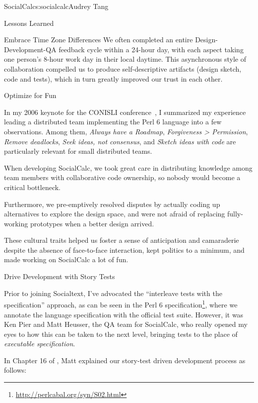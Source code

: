 \begin{aosachapter}{SocialCalc}{s:socialcalc}{Audrey Tang}
\begin{aosasect1}{Lessons Learned}
\begin{aosasect2}{Embrace Time Zone Differences}
We often completed an entire Design-Development-QA feedback cycle
within a 24-hour day, with each aspect taking one person's 8-hour
work day in their local daytime.  This asynchronous style of
collaboration compelled us to produce self-descriptive artifacts
(design sketch, code and tests), which in turn greatly improved our
trust in each other.

\end{aosasect2}

\begin{aosasect2}{Optimize for Fun}

In my 2006 keynote for the CONISLI conference~\cite{bib:tang:fun}, I
summarized my experience leading a distributed team implementing the
Perl 6 language into a few observations.  Among them, \emph{Always
 have a Roadmap}, \emph{Forgiveness {\textgreater} Permission},
\emph{Remove deadlocks}, \emph{Seek ideas, not consensus}, and
\emph{Sketch ideas with code} are particularly relevant for small
distributed teams.

When developing SocialCalc, we took great care in distributing
knowledge among team members with collaborative code ownership, so
nobody would become a critical bottleneck.

Furthermore, we pre-emptively resolved disputes by actually coding up
alternatives to explore the design space, and were not afraid of
replacing fully-working prototypes when a better design arrived.

These cultural traits helped us foster a sense of anticipation and
camaraderie despite the absence of face-to-face interaction, kept
politics to a minimum, and made working on SocialCalc a lot of fun.

\end{aosasect2}

\begin{aosasect2}{Drive Development with Story Tests}

Prior to joining Socialtext, I've advocated the ``interleave tests
with the specification'' approach, as can be seen in the Perl 6
specification\footnote{\url{http://perlcabal.org/syn/S02.html}}, where
we annotate the language specification with the official test suite.
However, it was Ken Pier and Matt Heusser, the QA team for SocialCalc,
who really opened my eyes to how this can be taken to the next level,
bringing tests to the place of \emph{executable specification}.


In Chapter 16 of \cite{bib:goucher:test}, Matt explained our
story-test driven development process as follows:


\end{aosasect2}
\end{aosasect1}
\end{aosachapter}

